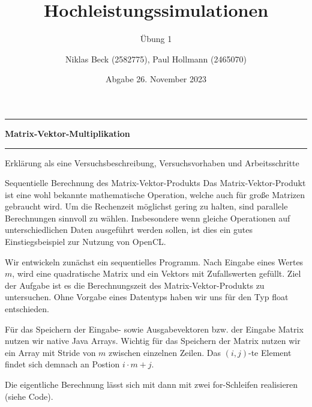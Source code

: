 \documentclass[
ngerman,
subtask=ruled %
]{tudaexercise}
\begin{document}
	
	\title[Übung Hochleistungssimulationen]{Hochleistungssimulationen}
	\subtitle{\"Ubung 1}
	\author{Niklas Beck (2582775), Paul Hollmann (2465070)}
	\date{Abgabe 26. November 2023}
	\maketitle
	
	\hrule
	{\Large \textbf{Matrix-Vektor-Multiplikation}}
	\hrule
	
	Erklärung als eine Versuchsbeschreibung, Versuchsvorhaben und Arbeitsschritte
	
	\begin{task}{Sequentielle Berechnung des Matrix-Vektor-Produkts}\label{task:1}
		Das Matrix-Vektor-Produkt ist eine wohl bekannte mathematische Operation, welche auch für große Matrizen gebraucht wird.
		Um die Rechenzeit möglichst gering zu halten, sind parallele Berechnungen sinnvoll zu wählen. Insbesondere wenn gleiche Operationen auf unterschiedlichen Daten ausgeführt werden sollen, ist dies ein gutes Einstiegsbeispiel zur Nutzung von OpenCL.
		
		Wir entwickeln zunächst ein sequentielles Programm.
		Nach Eingabe eines Wertes $m$, wird eine quadratische Matrix und ein Vektors mit Zufallswerten gefüllt.  Ziel der Aufgabe ist es die Berechnungszeit des Matrix-Vektor-Produkts zu untersuchen.
		Ohne Vorgabe eines Datentyps haben wir uns für den Typ float entschieden.

		
		Für das Speichern der Eingabe- sowie Ausgabevektoren bzw. der Eingabe Matrix nutzen wir native Java Arrays.
		Wichtig für das Speichern der Matrix nutzen wir ein Array mit Stride von $m$ zwischen einzelnen Zeilen.
		Das $(i,j)$-te Element findet sich demnach an Postion $i\cdot m + j$.
		
		Die eigentliche Berechnung lässt sich mit dann mit zwei for-Schleifen realisieren (siehe Code).
		
	\end{task}
	
\end{document}
